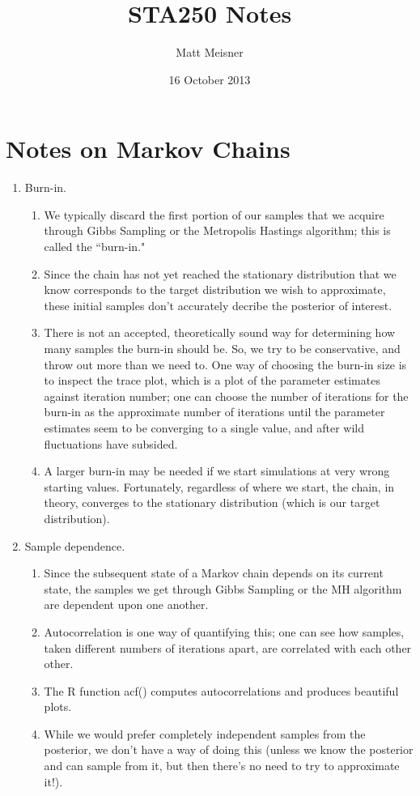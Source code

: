 \documentclass{article}
\title{\textbf{STA250 Notes}}
\author{Matt Meisner}
\date{16 October 2013}
\begin{document}
\maketitle
\section{Notes on Markov Chains}
\begin{enumerate}
\item Burn-in.
	\begin{enumerate}
	\item We typically discard the first portion of our samples that we acquire through Gibbs Sampling or the Metropolis Hastings algorithm; this is called the ``burn-in." 
	\item Since the chain has not yet reached the stationary distribution that we know corresponds to the target distribution we wish to approximate, these initial samples don't accurately decribe the posterior of interest. 
	\item There is not an accepted, theoretically sound way for determining how many samples the burn-in should be.  So, we try to be conservative, and throw out more than we need to.  One way of choosing the burn-in size is to inspect the trace plot, which is a plot of the parameter estimates against iteration number; one can choose the number of iterations for the burn-in as the approximate number of iterations until the parameter estimates seem to be converging to a single value, and after wild fluctuations have subsided.  
	\item A larger burn-in may be needed if we start simulations at very wrong starting values.  Fortunately, regardless of where we start, the chain, in theory, converges to the stationary distribution (which is our target distribution).  
	\end{enumerate}
\item Sample dependence.
	\begin{enumerate}
	\item Since the subsequent state of a Markov chain depends on its current state, the samples we get through Gibbs Sampling or the MH algorithm are dependent upon one another.
	\item Autocorrelation is one way of quantifying this; one can see how samples, taken different numbers of iterations apart, are correlated with each other other. 
	\item The R function acf() computes autocorrelations and produces beautiful plots. 
	\item While we would prefer completely independent samples from the posterior, we don't have a way of doing this (unless we know the posterior and can sample from it, but then there's no need to try to approximate it!).

\end{enumerate}
\end{enumerate}
\end{document}
